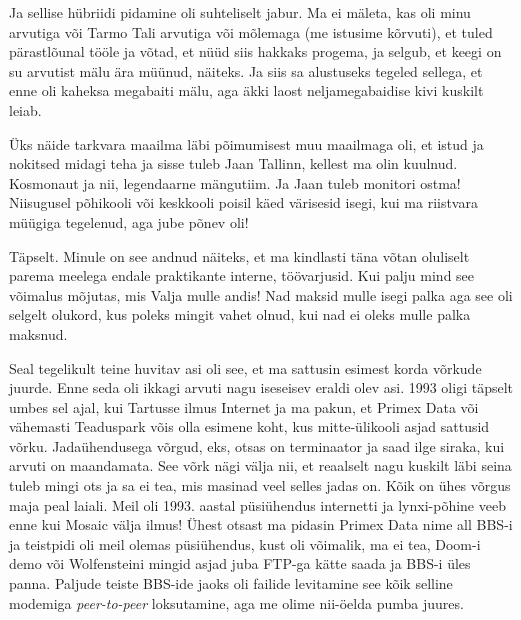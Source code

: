 Ja sellise hübriidi  pidamine oli suhteliselt jabur. Ma ei mäleta, kas oli minu 
arvutiga või Tarmo Tali arvutiga või mõlemaga (me 
istusime kõrvuti), et tuled pärastlõunal tööle ja võtad, et nüüd siis hakkaks 
progema, ja selgub, et keegi on su arvutist mälu ära müünud, näiteks. Ja siis 
sa  alustuseks tegeled sellega, et enne oli kaheksa megabaiti mälu, aga äkki 
laost neljamegabaidise kivi kuskilt leiab. 

Üks näide tarkvara maailma läbi põimumisest muu maailmaga oli, et istud ja 
nokitsed midagi teha ja sisse tuleb  Jaan Tallinn, 
kellest ma olin kuulnud. Kosmonaut ja nii, legendaarne mängutiim. Ja Jaan tuleb 
monitori ostma! Niisugusel põhikooli või keskkooli poisil käed värisesid isegi, 
kui ma riistvara müügiga tegelenud, aga jube põnev oli!


Täpselt. Minule on see andnud näiteks, et ma kindlasti täna võtan oluliselt 
parema meelega endale praktikante interne, töövarjusid. Kui palju mind see 
võimalus mõjutas, mis Valja  mulle 
andis! Nad maksid mulle isegi palka aga see oli selgelt olukord, kus poleks 
mingit vahet olnud, kui nad ei oleks mulle palka maksnud.

Seal tegelikult teine huvitav asi oli see, et ma sattusin esimest korda võrkude 
juurde. Enne seda oli ikkagi arvuti nagu iseseisev eraldi olev asi. 1993 oligi 
täpselt umbes sel ajal, kui Tartusse ilmus Internet ja ma pakun, et Primex Data 
või vähemasti Teaduspark võis olla esimene koht, kus 
mitte-ülikooli asjad sattusid võrku. Jadaühendusega võrgud, eks, otsas on 
terminaator ja saad ilge siraka, kui arvuti on maandamata. See võrk nägi välja 
nii, et reaalselt nagu kuskilt läbi seina tuleb mingi ots ja sa ei tea, mis 
masinad veel selles jadas on. Kõik on ühes võrgus maja peal laiali. Meil oli 
1993. aastal  püsiühendus internetti ja lynxi-põhine veeb enne kui Mosaic  
välja ilmus! Ühest otsast ma pidasin Primex Data nime all BBS-i ja teistpidi 
oli meil olemas püsiühendus, kust oli võimalik, ma ei tea, 
Doom-i demo või Wolfensteini 
mingid asjad juba FTP-ga kätte saada ja BBS-i üles panna. Paljude teiste 
BBS-ide jaoks oli failide levitamine see kõik selline modemiga 
\emph{peer-to-peer} loksutamine, aga me olime nii-öelda pumba juures. 

